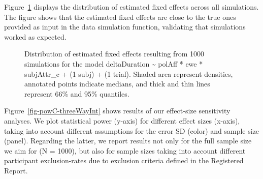 \documentclass[
  letterpaper,
  DIV=11,
  numbers=noendperiod]{scrartcl}
\begin{document}
Figure~\ref{fig-checkSims-threeWayInt} displays the distribution of
estimated fixed effects across all simulations. The figure shows that
the estimated fixed effects are close to the true ones provided as input
in the data simulation function, validating that simulations worked as
expected.

\begin{figure}


\caption{\label{fig-checkSims-threeWayInt}Distribution of estimated
fixed effects resulting from 1000 simulations for the model
deltaDuration \textasciitilde{} polAff * ewe * subjAttr\_c + (1
\textbar{} subj) + (1 \textbar{} trial). Shaded area represent
densities, annotated points indicate medians, and thick and thin lines
represent 66\% and 95\% quantiles.}

\end{figure}%

Figure~\ref{fig-powC-threeWayInt} shows results of our effect-size
sensitivity analyses. We plot statistical power (y-axis) for different
effect sizes (x-axis), taking into account different assumptions for the
error SD (color) and sample size (panel). Regarding the latter, we
report results not only for the full sample size we aim for (N = 1000),
but also for sample sizes taking into account different participant
exclusion-rates due to exclusion criteria defined in the Registered
Report.
\end{document}
